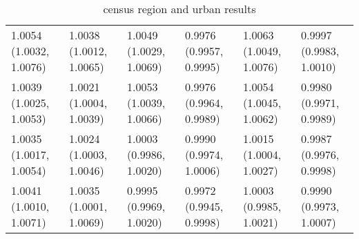 \begin{table}[ht]
\begin{tabular}{llllll}
  1.0054 (1.0032, 1.0076) & 1.0038 (1.0012, 1.0065) & 1.0049 (1.0029, 1.0069) & 0.9976 (0.9957, 0.9995) & 1.0063 (1.0049, 1.0076) & 0.9997 (0.9983, 1.0010) \\ 
  1.0039 (1.0025, 1.0053) & 1.0021 (1.0004, 1.0039) & 1.0053 (1.0039, 1.0066) & 0.9976 (0.9964, 0.9989) & 1.0054 (1.0045, 1.0062) & 0.9980 (0.9971, 0.9989) \\ 
  1.0035 (1.0017, 1.0054) & 1.0024 (1.0003, 1.0046) & 1.0003 (0.9986, 1.0020) & 0.9990 (0.9974, 1.0006) & 1.0015 (1.0004, 1.0027) & 0.9987 (0.9976, 0.9998) \\ 
  1.0041 (1.0010, 1.0071) & 1.0035 (1.0001, 1.0069) & 0.9995 (0.9969, 1.0020) & 0.9972 (0.9945, 0.9998) & 1.0003 (0.9985, 1.0021) & 0.9990 (0.9973, 1.0007) \\ 
   \hline
\end{tabular}
\caption{census region and urban results} 
\label{tab:stratified_OR_table_census_region_urban}
\end{table}
